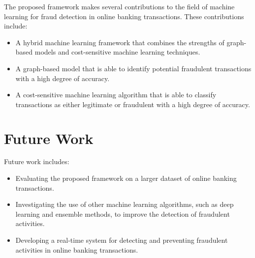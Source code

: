 \documentclass{article}
\begin{document}
        The proposed framework makes several contributions to the field of machine learning for fraud detection in online banking transactions. These contributions include:

        \begin{itemize}
        \item A hybrid machine learning framework that combines the strengths of graph-based models and cost-sensitive machine learning techniques.
        \item A graph-based model that is able to identify potential fraudulent transactions with a high degree of accuracy.
        \item A cost-sensitive machine learning algorithm that is able to classify transactions as either legitimate or fraudulent with a high degree of accuracy.
        \end{itemize}

        \section{Future Work}

        Future work includes:

        \begin{itemize}
        \item Evaluating the proposed framework on a larger dataset of online banking transactions.
        \item Investigating the use of other machine learning algorithms, such as deep learning and ensemble methods, to improve the detection of fraudulent activities.
        \item Developing a real-time system for detecting and preventing fraudulent activities in online banking transactions.
        \end{itemize}

        
\end{document}
